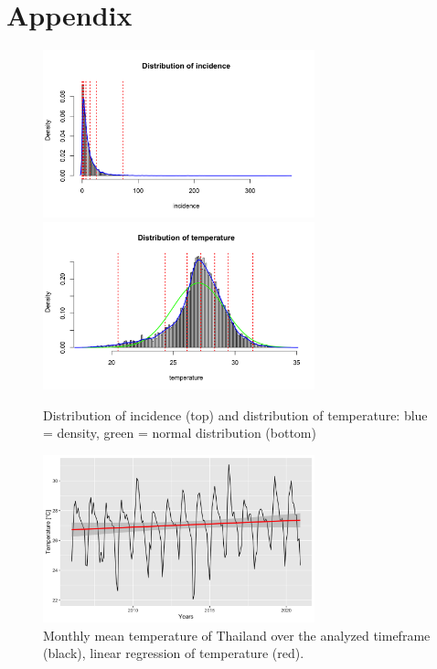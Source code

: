 \documentclass[parskip]{scrartcl}
\begin{document}


\newpage
\section{Appendix}


\begin{figure}[htbp] 
	\centering
	\includegraphics[width=0.7\textwidth]{fig/dist_incidence.png}
	\includegraphics[width=0.7\textwidth]{fig/dist_temp.png}
	\caption{Distribution of incidence (top)
		and distribution of temperature: blue = density, green = normal distribution (bottom)}
	\label{fig:dist_temp_inc}
\end{figure}


\begin{figure}[htbp] 
	\centering
	\includegraphics[width=0.7\textwidth]{fig/temp_over_years.png}
	\caption{Monthly mean temperature of Thailand over the analyzed timeframe (black), linear regression of temperature (red).}
	\label{fig:temp_over_years}
\end{figure}
\end{document}
